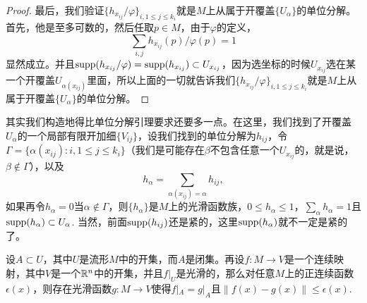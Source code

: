 \begin{proof}
最后，我们验证$\{h_{x_{ij}}/\varphi\}_{i,1\leq j\leq k_i}$就是$M$上从属于开覆盖$\{U_\alpha\}$的单位分解。首先，他是至多可数的，然后任取$p\in M$，由于$\varphi$的定义，
\[
	\sum_{i,j}h_{x_{ij}}(p)/\varphi(p)=1
\]
显然成立。并且$\operatorname{supp}(h_{x_{ij}}/\varphi)=\operatorname{supp}(h_{x_{ij}})\subset U_{x_{ij}}$，因为选坐标的时候$U_{x_{ij}}$选在某一个开覆盖$U_{\alpha(x_{ij})}$里面，所以上面的一切就告诉我们$\{h_{x_{ij}}/\varphi\}_{i,1\leq j\leq k_i}$就是$M$上从属于开覆盖$\{U_\alpha\}$的单位分解。
\end{proof}

其实我们构造地得比单位分解引理要求还要多一点。在这里，我们找到了开覆盖$U_{\alpha}$的一个局部有限开加细$\{V_{ij}\}$，设我们找到的单位分解为$h_{ij}$，令$\Gamma=\{\alpha(x_{ij}):i,1\leq j\leq k_i\}$（我们是可能存在$\beta$不包含任意一个$U_{x_{ij}}$的，就是说，$\beta\notin \Gamma$），以及
\[
	h_{\alpha}=\sum_{\alpha(x_{ij})=\alpha}h_{ij},
\]
如果再令$h_{\alpha}=0$当$\alpha\notin \Gamma$，则$\{h_{\alpha}\}$是$M$上的光滑函数族，$0\leq h_\alpha\leq 1$，$\sum_{\alpha}h_\alpha=1$且$\operatorname{supp}(h_\alpha)\subset U_{\alpha}$. 当然，前面$\operatorname{supp}(h_{ij})$还是紧的，这里$\operatorname{supp}(h_\alpha)$就不一定是紧的了。


\begin{lem}
设$A\subset U$，其中$U$是流形$M$中的开集，而$A$是闭集。再设$f:M\to V$是一个连续映射，其中$V$是一个$\mathbb{R}^n$中的开集，并且$f|_{U}$是光滑的，那么对任意$M$上的正连续函数$\epsilon(x)$，则存在光滑函数$g:M\to V$使得$f|_A=g|_A$且$\|f(x)-g(x)\|\leq \epsilon(x)$.
\end{lem}

